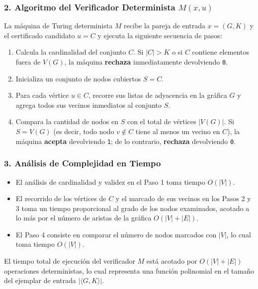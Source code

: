 \begin{itemize}[leftmargin=*]
    \subsubsection*{2. Algoritmo del Verificador Determinista $M(x, u)$}

    La máquina de Turing determinista $M$ recibe la pareja de entrada $x = (G, K)$ y el certificado candidato $u = C$ y ejecuta la siguiente secuencia de pasos:

    \begin{enumerate}[label=\arabic*., leftmargin=*]
        \item Calcula la cardinalidad del conjunto $C$. Si $|C| > K$ o si $C$ contiene elementos fuera de $V(G)$, la máquina \textbf{rechaza} inmediatamente devolviendo \texttt{0}.
        \item Inicializa un conjunto de nodos cubiertos $S = C$.
        \item Para cada vértice $u \in C$, recorre sus listas de adyacencia en la gráfica $G$ y agrega todos sus vecinos inmediatos al conjunto $S$.
        \item Compara la cantidad de nodos en $S$ con el total de vértices $|V(G)|$. Si $S = V(G)$ (es decir, todo nodo $v \notin C$ tiene al menos un vecino en $C$), la máquina \textbf{acepta} devolviendo \texttt{1}; de lo contrario, \textbf{rechaza} devolviendo \texttt{0}.
    \end{enumerate}

    \subsubsection*{3. Análisis de Complejidad en Tiempo}

    \begin{itemize}[leftmargin=*]
        \item El análisis de cardinalidad y validez en el Paso 1 toma tiempo $O(|V|)$.
        \item El recorrido de los vértices de $C$ y el marcado de sus vecinos en los Pasos 2 y 3 toma un tiempo proporcional al grado de los nodos examinados, acotado a lo más por el número de aristas de la gráfica $O(|V| + |E|)$.
        \item El Paso 4 consiste en comparar el número de nodos marcados con $|V|$, lo cual toma tiempo $O(|V|)$.
    \end{itemize}

    El tiempo total de ejecución del verificador $M$ está acotado por $O(|V| + |E|)$ operaciones deterministas, lo cual representa una función polinomial en el tamaño del ejemplar de entrada $|\langle G, K \rangle|$.


\end{itemize}

